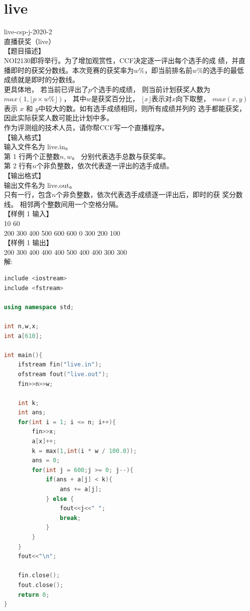 \documentclass[12pt,twiside,a4paper]{ctexbook}
\numberwithin{chapter}{part}
\begin{document}
\section{live}
live-csp-j-2020-2\\
直播获奖（live）\\
【题目描述】\\
NOI2130即将举行。为了增加观赏性，CCF决定逐一评出每个选手的成
绩，并直播即时的获奖分数线。本次竞赛的获奖率为$w\%$，即当前排名前$w\%$的选手的最低成绩就是即时的分数线。\\
更具体地， 若当前已评出了$p$个选手的成绩， 则当前计划获奖人数为
$max(1,\lfloor p\times w\%\rfloor)$， 其中$w$是获奖百分比， $\lfloor x \rfloor$表示对$x$向下取整，
$max(x,y)$ 表示 $x$ 和 $y$中较大的数。如有选手成绩相同，则所有成绩并列的
选手都能获奖，因此实际获奖人数可能比计划中多。\\
作为评测组的技术人员，请你帮CCF写一个直播程序。\\
【输入格式】\\
输入文件名为 live.in。\\
第 1 行两个正整数$n,w$。 分别代表选手总数与获奖率。\\
第 2 行有$n$个非负整数，依次代表逐一评出的选手成绩。\\
【输出格式】\\
输出文件名为 live.out。\\
只有一行，包含$n$个非负整数，依次代表选手成绩逐一评出后，即时的获
奖分数线。 相邻两个整数间用一个空格分隔。\\
【样例 1 输入】\\
10 60\\
200 300 400 500 600 600 0 300 200 100\\
【样例 1 输出】\\
200 300 400 400 400 500 400 400 300 300\\
解:
\begin{lstlisting}[language=C++,breaklines = true]
include <iostream>
include <fstream>

using namespace std;

int n,w,x;
int a[610];

int main(){
	ifstream fin("live.in");
	ofstream fout("live.out");
	fin>>n>>w;

	int k;
	int ans;
	for(int i = 1; i <= n; i++){
		fin>>x;
		a[x]++;
		k = max(1,int(i * w / 100.0));
		ans = 0;
		for(int j = 600;j >= 0; j--){
			if(ans + a[j] < k){
				ans += a[j];
			} else {
				fout<<j<<" ";
				break;
			}
		}
	}
	fout<<"\n";

	fin.close();
	fout.close();
	return 0;
}
\end{lstlisting}
\end{document}
